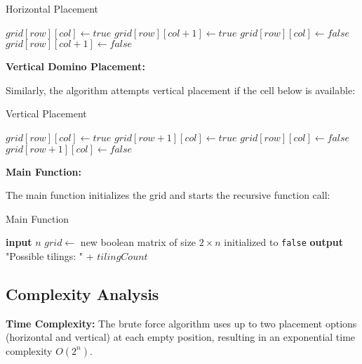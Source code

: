 \documentclass[conference]{IEEEtran}
\begin{document}
\begin{algorithm}[htbp]
\caption{Horizontal Placement}
\begin{algorithmic}[1]
    \State $grid[row][col] \gets true$
    \State $grid[row][col + 1] \gets true$
    \State {}
    \State $grid[row][col] \gets false$ 
    \State $grid[row][col + 1] \gets false$
\EndIf
\end{algorithmic}
\end{algorithm}

\textbf{Vertical Domino Placement:}

Similarly, the algorithm attempts vertical placement if the cell below is available:

\begin{algorithm}[htbp]
\caption{Vertical Placement}
\begin{algorithmic}[1]
    \State $grid[row][col] \gets true$
    \State $grid[row + 1][col] \gets true$
    \State {}
    \State $grid[row][col] \gets false$ 
    \State $grid[row + 1][col] \gets false$
\EndIf
\end{algorithmic}
\end{algorithm}

\textbf{Main Function:}

The main function initializes the grid and starts the recursive function call:

\begin{algorithm}[htbp]
\caption{Main Function}
\begin{algorithmic}[1]
    \State \textbf{input} $n$ 
    \State $grid \gets$ new boolean matrix of size $2 \times n$ initialized to \texttt{false}
    \State {}
    \State \textbf{output} "Possible tilings: " + $tilingCount$
\EndProcedure
\end{algorithmic}
\end{algorithm}

\subsection{Complexity Analysis}

\textbf{Time Complexity:} The brute force algorithm uses up to two placement options (horizontal and vertical) at each empty position, resulting in an exponential time complexity $O(2^n)$.
\end{document}
